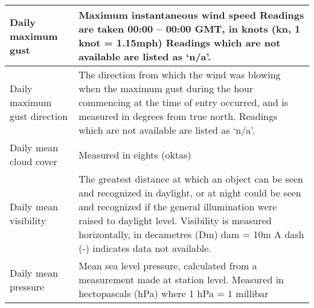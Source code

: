\begin{tabular}{|p{5.5cm}|p{11.5cm}|}
    \hline
    Daily maximum gust              & Maximum instantaneous wind speed \newline Readings are taken 00:00 – 00:00 GMT, in knots (kn, 1 knot = 1.15mph) \newline
    Readings which are not available are listed as ‘n/a’.                                                                                                                                                                                                \\
    \hline
    Daily maximum gust direction    & The direction from which the wind was blowing when the maximum gust during the hour commencing at the time of entry occurred, and is measured in degrees from true north.  \newline
    Readings which are not available are listed as ‘n/a’.                                                                                                                                                                                                \\
    \hline
    Daily mean cloud cover          & Measured in eights (oktas)                                                                                                                                                                                         \\
    \hline
    Daily mean visibility           & The greatest distance at which an object can be seen and recognized in daylight, or at night could be seen and recognized if the general illumination were raised to daylight level.
    \newline Visibility is measured horizontally, in decametres (Dm) dam = 10m \newline A dash (-) indicates data not available.
    \\
    \hline
    Daily mean pressure             & Mean sea level pressure, calculated from a measurement made at station level. \newline Measured in hectopascals (hPa) 	where 1 hPa = 1 millibar
    \\
    \hline
\end{tabular}
